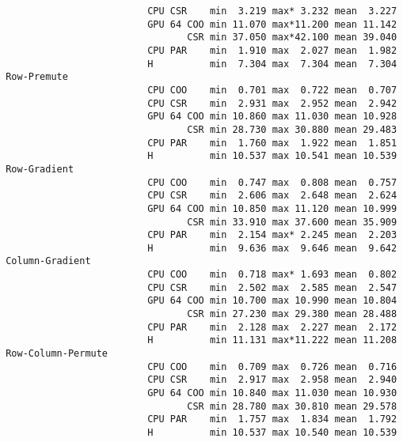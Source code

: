 {\begin{verbatim}
                          CPU CSR    min  3.219 max* 3.232 mean  3.227
                          GPU 64 COO min 11.070 max*11.200 mean 11.142
                                 CSR min 37.050 max*42.100 mean 39.040
                          CPU PAR    min  1.910 max  2.027 mean  1.982
                          H          min  7.304 max  7.304 mean  7.304
 Row-Premute
                          CPU COO    min  0.701 max  0.722 mean  0.707
                          CPU CSR    min  2.931 max  2.952 mean  2.942
                          GPU 64 COO min 10.860 max 11.030 mean 10.928
                                 CSR min 28.730 max 30.880 mean 29.483
                          CPU PAR    min  1.760 max  1.922 mean  1.851
                          H          min 10.537 max 10.541 mean 10.539
 Row-Gradient
                          CPU COO    min  0.747 max  0.808 mean  0.757
                          CPU CSR    min  2.606 max  2.648 mean  2.624
                          GPU 64 COO min 10.850 max 11.120 mean 10.999
                                 CSR min 33.910 max 37.600 mean 35.909
                          CPU PAR    min  2.154 max* 2.245 mean  2.203
                          H          min  9.636 max  9.646 mean  9.642
 Column-Gradient
                          CPU COO    min  0.718 max* 1.693 mean  0.802
                          CPU CSR    min  2.502 max  2.585 mean  2.547
                          GPU 64 COO min 10.700 max 10.990 mean 10.804
                                 CSR min 27.230 max 29.380 mean 28.488
                          CPU PAR    min  2.128 max  2.227 mean  2.172
                          H          min 11.131 max*11.222 mean 11.208
 Row-Column-Permute
                          CPU COO    min  0.709 max  0.726 mean  0.716
                          CPU CSR    min  2.917 max  2.958 mean  2.940
                          GPU 64 COO min 10.840 max 11.030 mean 10.930
                                 CSR min 28.780 max 30.810 mean 29.578
                          CPU PAR    min  1.757 max  1.834 mean  1.792
                          H          min 10.537 max 10.540 mean 10.539
\end{verbatim}
}
